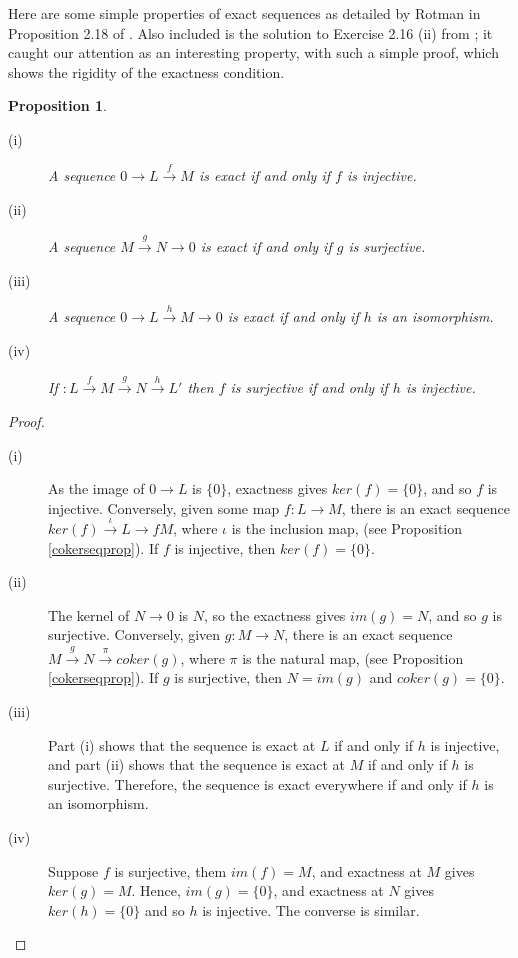 \documentclass[11.5pt, twoside, a4paper, titlepage]{report}
\theoremstyle{definition}
\theoremstyle{plain}
\newtheorem{prop}[mydef]{Proposition}
\begin{document}
Here are some simple properties of exact sequences as detailed by Rotman in Proposition 2.18 of \cite{Rotman}. Also included is the solution to Exercise 2.16 (ii) from \cite{Rotman}; it caught our attention as an interesting property, with such a simple proof, which shows the rigidity of the exactness condition.
\begin{prop}
\begin{description}
\item[(i)] A sequence $0\xrightarrow{}L\xrightarrow{f}M$ is exact if and only if $f$ is injective.
\item[(ii)] A sequence $M\xrightarrow{g}N\xrightarrow{}0$ is exact if and only if $g$ is surjective.
\item[(iii)] A sequence $0\xrightarrow{}L\xrightarrow{h}M\xrightarrow{}0$ is exact if and only if $h$ is an isomorphism.
\item[(iv)] If $:L\xrightarrow{f} M \xrightarrow{g}N\xrightarrow{h}L'$ then $f$ is surjective if and only if $h$ is injective.
\end{description}
\end{prop}
\begin{proof}
\begin{description}
\item[(i)] As the image of $0\xrightarrow{}L$ is $\{0\}$, exactness gives $ker(f)=\{0\}$, and so $f$ is injective. Conversely, given some map $f:L\to M$, there is an exact sequence $ker(f)\xrightarrow{\iota}L\rightarrow{f}M$, where $\iota$ is the inclusion map, (see Proposition \ref{cokerseqprop}). If $f$ is injective, then $ker(f)=\{0\}$.
\item[(ii)] The kernel of $N\xrightarrow{}0$ is $N$, so the exactness gives $im(g)=N$, and so $g$ is surjective. Conversely, given $g:M\to N$, there is an exact sequence $M\xrightarrow{g}N\xrightarrow{\pi}coker(g)$, where $\pi$ is the natural map, (see Proposition \ref{cokerseqprop}). If $g$ is surjective, then $N=im(g)$ and $coker(g)=\{0\}$.
\item[(iii)] Part (i) shows that the sequence is exact at $L$ if and only if $h$ is injective, and part (ii) shows that the sequence is exact at $M$ if and only if $h$ is surjective. Therefore, the sequence is exact everywhere if and only if $h$ is an isomorphism.
\item[(iv)] Suppose $f$ is surjective, them $im(f)=M$, and exactness at $M$ gives $ker(g)=M$. Hence, $im(g)=\{0\}$, and exactness at $N$ gives $ker(h)=\{0\}$ and so $h$ is injective. The converse is similar.
\end{description}
\end{proof}
\end{document}
